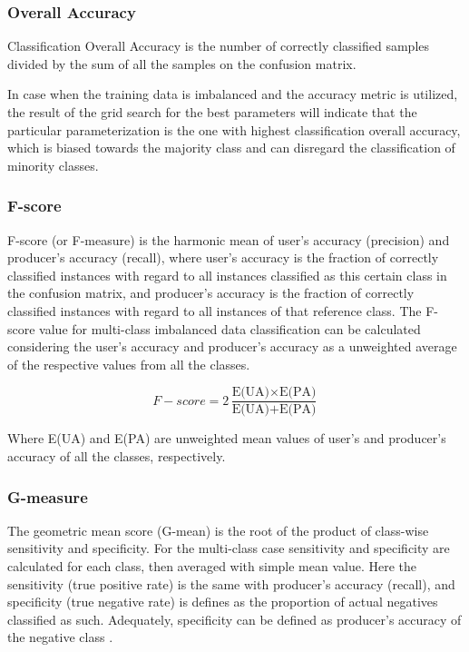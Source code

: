 \documentclass[parskip=full]{scrartcl}
\begin{document}
\subsubsection{Overall Accuracy}

Classification Overall Accuracy is the number of correctly classified samples
divided by the sum of all the samples on the confusion matrix.

In case when the training data is imbalanced and the accuracy metric is
utilized, the result of the grid search for the best parameters will indicate
that the particular parameterization is the one with highest classification
overall accuracy, which is biased towards the majority class and can disregard
the classification of minority classes.

\subsubsection{F-score}

F-score (or F-measure) is the harmonic mean of user's accuracy (precision) and
producer's accuracy (recall), where user's accuracy is the fraction of
correctly classified instances with regard to all instances classified as this
certain class in the confusion matrix, and producer's accuracy is the fraction
of  correctly classified instances with regard to all instances of that
reference class. The F-score value for multi-class imbalanced data
classification can be calculated considering the user's accuracy and producer's
accuracy as a unweighted average of the respective values from all the classes.

\[
F{-}score=2\frac{\text{E(UA)} \times \text{E(PA)}}{\text{E(UA)} + \text{E(PA)}}
\]

Where E(UA) and E(PA) are unweighted mean values of user's and producer's
accuracy of all the classes, respectively.

\subsubsection{G-measure}

The geometric mean score (G-mean) is the root of the product of class-wise
sensitivity and specificity. For the multi-class case sensitivity and
specificity are calculated for each class, then averaged with simple mean
value. Here the sensitivity (true positive rate) is the same with producer's
accuracy (recall), and specificity (true negative rate) is defines as
the proportion of actual negatives classified as such. Adequately, specificity
can be defined as producer's accuracy of the negative class \cite{Silva2017}.
\end{document}
